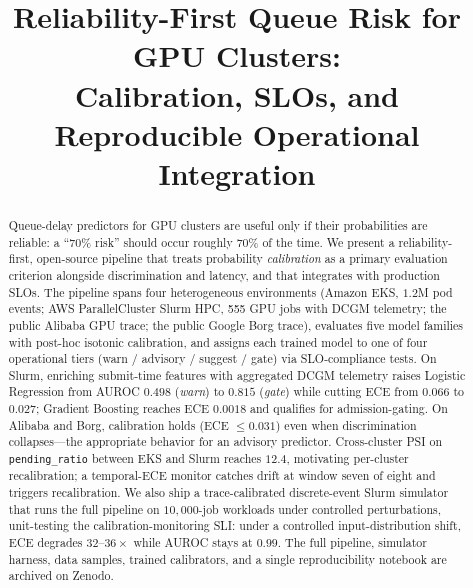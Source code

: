 \documentclass[conference]{IEEEtran}
\begin{document}
\title{Reliability-First Queue Risk for GPU Clusters:\\Calibration, SLOs, and Reproducible Operational Integration}

\author{
}

\maketitle

\begin{abstract}
Queue-delay predictors for GPU clusters are useful only if their probabilities are reliable: a ``70\% risk'' should occur roughly 70\% of the time. We present a reliability-first, open-source pipeline that treats probability \emph{calibration} as a primary evaluation criterion alongside discrimination and latency, and that integrates with production SLOs. The pipeline spans four heterogeneous environments (Amazon EKS, $1.2$M pod events; AWS ParallelCluster Slurm HPC, 555 GPU jobs with DCGM telemetry; the public Alibaba GPU trace; the public Google Borg trace), evaluates five model families with post-hoc isotonic calibration, and assigns each trained model to one of four operational tiers (warn / advisory / suggest / gate) via SLO-compliance tests. On Slurm, enriching submit-time features with aggregated DCGM telemetry raises Logistic Regression from AUROC $0.498$ (\textit{warn}) to $0.815$ (\textit{gate}) while cutting ECE from $0.066$ to $0.027$; Gradient Boosting reaches ECE $0.0018$ and qualifies for admission-gating. On Alibaba and Borg, calibration holds (ECE $\leq 0.031$) even when discrimination collapses---the appropriate behavior for an advisory predictor. Cross-cluster PSI on \texttt{pending\_ratio} between EKS and Slurm reaches $12.4$, motivating per-cluster recalibration; a temporal-ECE monitor catches drift at window seven of eight and triggers recalibration. We also ship a trace-calibrated discrete-event Slurm simulator that runs the full pipeline on $10{,}000$-job workloads under controlled perturbations, unit-testing the calibration-monitoring SLI: under a controlled input-distribution shift, ECE degrades $32$--$36\times$ while AUROC stays at $0.99$. The full pipeline, simulator harness, data samples, trained calibrators, and a single reproducibility notebook are archived on Zenodo.
\end{abstract}
\end{document}
